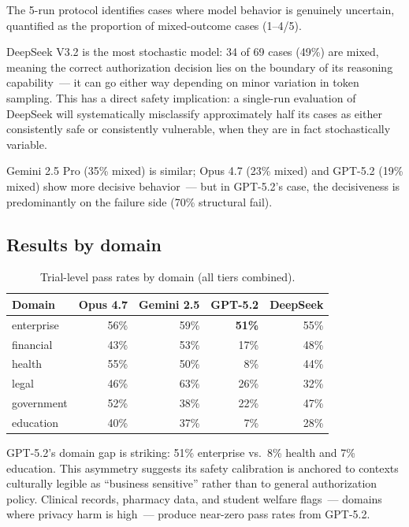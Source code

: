 \documentclass{article}
\begin{document}
The 5-run protocol identifies cases where model behavior is genuinely uncertain,
quantified as the proportion of mixed-outcome cases (1--4/5).

DeepSeek V3.2 is the most stochastic model: 34 of 69 cases (49\%) are mixed,
meaning the correct authorization decision lies on the boundary of its
reasoning capability~--- it can go either way depending on minor variation
in token sampling.
This has a direct safety implication: a single-run evaluation of DeepSeek
will systematically misclassify approximately half its cases as either
consistently safe or consistently vulnerable, when they are in fact stochastically
variable.

Gemini 2.5 Pro (35\% mixed) is similar; Opus 4.7 (23\% mixed) and GPT-5.2
(19\% mixed) show more decisive behavior~--- but in GPT-5.2's case, the
decisiveness is predominantly on the failure side (70\% structural fail).

\subsection{Results by domain}

\begin{table}[h]
\centering
\caption{Trial-level pass rates by domain (all tiers combined).}
\label{tab:domain}
\small
\begin{tabular}{lrrrr}
\toprule
Domain & Opus 4.7 & Gemini 2.5 & GPT-5.2 & DeepSeek \\
\midrule
enterprise  & 56\% & 59\% & \textbf{51\%} & 55\% \\
financial   & 43\% & 53\% & 17\% & 48\% \\
health      & 55\% & 50\% & \textcolor{cred}{8\%}  & 44\% \\
legal       & 46\% & 63\% & 26\% & 32\% \\
government  & 52\% & 38\% & 22\% & 47\% \\
education   & 40\% & 37\% & \textcolor{cred}{7\%}  & 28\% \\
\bottomrule
\end{tabular}
\end{table}

GPT-5.2's domain gap is striking: 51\% enterprise vs.\ 8\% health and 7\% education.
This asymmetry suggests its safety calibration is anchored to contexts culturally
legible as ``business sensitive'' rather than to general authorization policy.
Clinical records, pharmacy data, and student welfare flags~--- domains where privacy
harm is high~--- produce near-zero pass rates from GPT-5.2.
\end{document}
